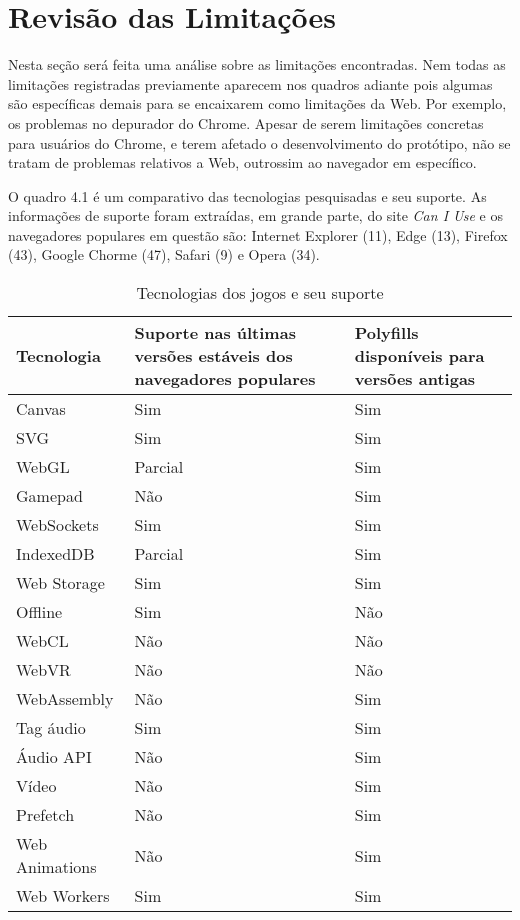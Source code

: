 \section{Revisão das Limitações}

Nesta seção será feita uma análise sobre as limitações
encontradas. Nem todas as limitações registradas previamente aparecem
nos quadros adiante pois algumas são específicas demais para se
encaixarem como limitações da Web. Por exemplo, os problemas no
depurador do Chrome. Apesar de serem limitações concretas para
usuários do Chrome, e terem afetado o desenvolvimento do protótipo,
não se tratam de problemas relativos a Web, outrossim ao navegador em
específico.

O quadro 4.1 é um comparativo das tecnologias pesquisadas e seu
suporte. As informações de suporte foram extraídas, em grande parte, do site
\textit{Can I Use} e os navegadores populares em questão são: Internet
Explorer (11), Edge (13), Firefox (43), Google Chorme (47), Safari (9) e
Opera (34).

\begin{table}[H]
\begin{tabular}{ |p{3cm}|p{3cm}|p{3cm}|  }
\hline
Tecnologia & Suporte nas últimas versões estáveis dos navegadores populares & Polyfills disponíveis  para versões antigas \\ \hline
Canvas & Sim & Sim \\ \hline
SVG & Sim & Sim \\ \hline
WebGL & Parcial & Sim \\ \hline
Gamepad & Não & Sim \\ \hline
WebSockets & Sim & Sim \\ \hline
IndexedDB & Parcial & Sim \\ \hline
Web Storage & Sim & Sim \\ \hline
Offline & Sim & Não \\ \hline
WebCL & Não & Não \\ \hline
WebVR & Não & Não \\ \hline
WebAssembly & Não & Sim \\ \hline
Tag áudio & Sim & Sim \\ \hline
Áudio API & Não & Sim \\ \hline
Vídeo & Não & Sim \\ \hline
Prefetch & Não & Sim \\ \hline
Web Animations & Não & Sim \\ \hline
Web Workers & Sim & Sim\\ \hline
\end{tabular}
\label{table:apisSupport}
\caption{Tecnologias dos jogos e seu suporte}
\end{table}

